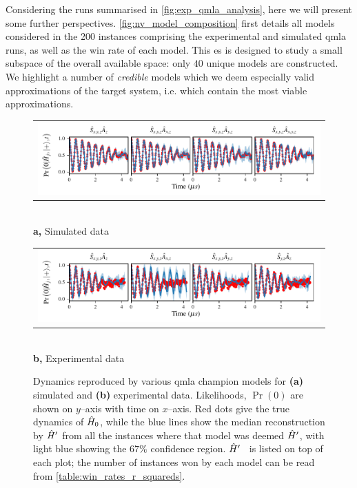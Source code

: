 Considering the \glspl{run} summarised in \cref{fig:exp_qmla_analysis}, here we will present some further perspectives.
\cref{fig:nv_model_composition} first details all models considered in the 200 \glspl{instance} 
    comprising the experimental and simulated \gls{qmla} \glspl{run}, 
    as well as the  \gls{win rate}  of each model. 
This \gls{es} is designed to study a small subspace of the overall available space:
    only $40$ unique models are constructed. 
We highlight a number of \emph{credible} models which we deem especially valid approximations of the target system, 
    i.e. which contain the most viable approximations. 
\par 

\begin{figure}[t]
    \centering
    \begin{tabular}{@{}c@{}}
        \includegraphics[scale=0.99]{experimental_study/figures/reproduced_dyamics_sim.pdf}
    \end{tabular}
    \\ \small \textbf{a,} Simulated data
    \centering

    \begin{tabular}{@{}c@{}}
        \includegraphics[scale=0.99]{experimental_study/figures/reproduced_dyamics_exp.pdf}
    \end{tabular}
    \\ \small \textbf{b,} Experimental data

    \caption[Dynamics reproduced by QMLA champion models for simulated/experimental data]{
        Dynamics reproduced by various \gls{qmla} \glspl{champion model} for \textbf{(a)} simulated and \textbf{(b)} experimental data. 
        Likelihoods, $\Pr(0)$ are shown on $y$--axis with time on $x$--axis. 
        Red dots give the true dynamics of $\hat{H}_0$, while the blue lines show the median reconstruction by $\hat{H}^{\prime}$
        from all the \glspl{instance} where that model was deemed $\hat{H}^{\prime}$, with light blue showing the $67\%$ confidence region.
        $\hat{H}^{\prime}$ \ is listed on top of each plot; the number of \glspl{instance} won by each model can be read from \cref{table:win_rates_r_squareds}.
        \figtableref 
        }
    \label{fig:nv_model_dynamics}
\end{figure}

